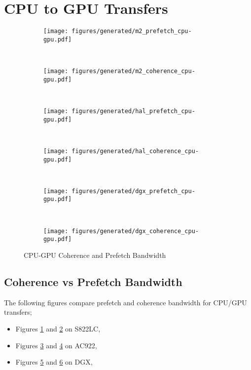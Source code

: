 \section{CPU to GPU Transfers}
\label{sec:um-cpu-gpu}


\begin{figure}[ht]
    \centering
    \begin{subfigure}[b]{0.45\textwidth}
        \texttt{[image: figures/generated/m2\_prefetch\_cpu-gpu.pdf]}
        \caption{}
        \label{fig:um-prefetch-s822lc-cpu-gpu}
    \end{subfigure}
    ~
    \begin{subfigure}[b]{0.45\textwidth}
        \texttt{[image: figures/generated/m2\_coherence\_cpu-gpu.pdf]}
        \caption{}
        \label{fig:um-coherence-s822lc-cpu-gpu}
    \end{subfigure}
    \\
    \begin{subfigure}[b]{0.45\textwidth}
        \texttt{[image: figures/generated/hal\_prefetch\_cpu-gpu.pdf]}
        \caption{}
        \label{fig:um-prefetch-ac922-cpu-gpu}
    \end{subfigure}
    ~
    \begin{subfigure}[b]{0.45\textwidth}
        \texttt{[image: figures/generated/hal\_coherence\_cpu-gpu.pdf]}
        \caption{}
        \label{fig:um-coherence-ac922-cpu-gpu}
    \end{subfigure}
    \\
    \begin{subfigure}[b]{0.45\textwidth}
        \texttt{[image: figures/generated/dgx\_prefetch\_cpu-gpu.pdf]}
        \caption{}
        \label{fig:um-prefetch-dgx-cpu-gpu}
    \end{subfigure}
    ~
    \begin{subfigure}[b]{0.45\textwidth}
        \texttt{[image: figures/generated/dgx\_coherence\_cpu-gpu.pdf]}
        \caption{}
        \label{fig:um-coherence-dgx-cpu-gpu}
    \end{subfigure}
    \caption[]{
        CPU-GPU Coherence and Prefetch Bandwidth
    }
    \label{fig:um-cpu-gpu}
\end{figure}



\subsection{Coherence vs Prefetch Bandwidth}
The following figures compare prefetch and coherence bandwidth for CPU/GPU transfers;
\begin{itemize}
    \item Figures \ref{fig:um-prefetch-s822lc-cpu-gpu} and \ref{fig:um-coherence-s822lc-cpu-gpu} on S822LC,
    \item Figures \ref{fig:um-prefetch-ac922-cpu-gpu} and \ref{fig:um-coherence-ac922-cpu-gpu}   on AC922,
    \item Figures \ref{fig:um-prefetch-dgx-cpu-gpu} and \ref{fig:um-coherence-dgx-cpu-gpu}       on DGX,
\end{itemize}


